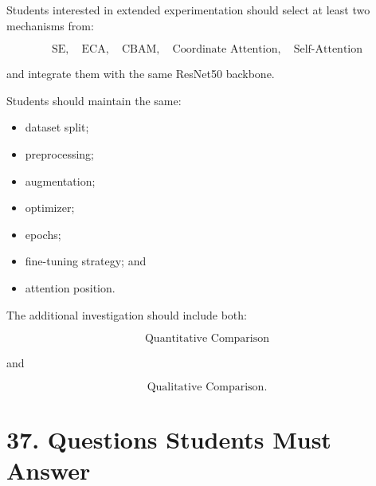 \documentclass[10pt]{article}
\begin{document}
Students interested in extended experimentation should select at least two
mechanisms from:

\[
\boxed{
\text{SE},
\quad
\text{ECA},
\quad
\text{CBAM},
\quad
\text{Coordinate Attention},
\quad
\text{Self-Attention}
}
\]

and integrate them with the same ResNet50 backbone.

Students should maintain the same:

\begin{itemize}

\item dataset split;

\item preprocessing;

\item augmentation;

\item optimizer;

\item epochs;

\item fine-tuning strategy; and

\item attention position.

\end{itemize}

The additional investigation should include both:

\[
\boxed{
\text{Quantitative Comparison}
}
\]

and

\[
\boxed{
\text{Qualitative Comparison}.
}
\]

\section*{37. Questions Students Must Answer}




\end{document}
